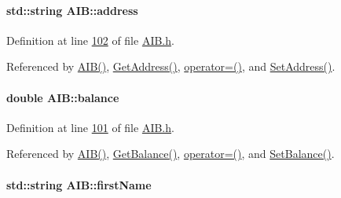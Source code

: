 \paragraph[{\texorpdfstring{address}{address}}]{\setlength{\rightskip}{0pt plus 5cm}std\+::string A\+I\+B\+::address\hspace{0.3cm}{\ttfamily [private]}}\hypertarget{class_a_i_b_ae6a67cc33d1e5fa83a52a238e45ca3dc_ae6a67cc33d1e5fa83a52a238e45ca3dc}{}\label{class_a_i_b_ae6a67cc33d1e5fa83a52a238e45ca3dc_ae6a67cc33d1e5fa83a52a238e45ca3dc}


Definition at line \hyperlink{_a_i_b_8h_source_l00102}{102} of file \hyperlink{_a_i_b_8h_source}{A\+I\+B.\+h}.



Referenced by \hyperlink{_a_i_b_8h_source_l00023}{A\+I\+B()}, \hyperlink{_a_i_b_8cpp_source_l00065}{Get\+Address()}, \hyperlink{_a_i_b_8h_source_l00066}{operator=()}, and \hyperlink{_a_i_b_8cpp_source_l00061}{Set\+Address()}.

\paragraph[{\texorpdfstring{balance}{balance}}]{\setlength{\rightskip}{0pt plus 5cm}double A\+I\+B\+::balance\hspace{0.3cm}{\ttfamily [private]}}\hypertarget{class_a_i_b_a3c8d637bd997c1f062d844a88e2559ba_a3c8d637bd997c1f062d844a88e2559ba}{}\label{class_a_i_b_a3c8d637bd997c1f062d844a88e2559ba_a3c8d637bd997c1f062d844a88e2559ba}


Definition at line \hyperlink{_a_i_b_8h_source_l00101}{101} of file \hyperlink{_a_i_b_8h_source}{A\+I\+B.\+h}.



Referenced by \hyperlink{_a_i_b_8h_source_l00023}{A\+I\+B()}, \hyperlink{_a_i_b_8cpp_source_l00073}{Get\+Balance()}, \hyperlink{_a_i_b_8h_source_l00066}{operator=()}, and \hyperlink{_a_i_b_8cpp_source_l00069}{Set\+Balance()}.

\paragraph[{\texorpdfstring{first\+Name}{firstName}}]{\setlength{\rightskip}{0pt plus 5cm}std\+::string A\+I\+B\+::first\+Name\hspace{0.3cm}{\ttfamily [private]}}\hypertarget{class_a_i_b_a869f72057cb63ebf0cfd257069e15c7c_a869f72057cb63ebf0cfd257069e15c7c}{}\label{class_a_i_b_a869f72057cb63ebf0cfd257069e15c7c_a869f72057cb63ebf0cfd257069e15c7c}



